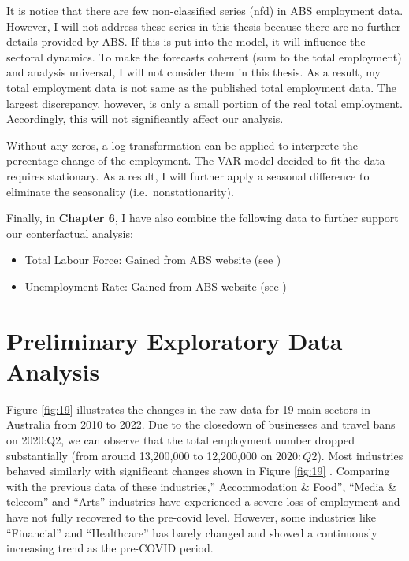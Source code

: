 \documentclass{monashthesis}
\begin{document}
It is notice that there are few non-classified series (nfd) in ABS employment data. However, I will not address these series in this thesis because there are no further details provided by ABS. If this is put into the model, it will influence the sectoral dynamics. To make the forecasts coherent (sum to the total employment) and analysis universal, I will not consider them in this thesis. As a result, my total employment data is not same as the published total employment data. The largest discrepancy, however, is only a small portion of the real total employment. Accordingly, this will not significantly affect our analysis.

Without any zeros, a log transformation can be applied to interprete the percentage change of the employment. The VAR model decided to fit the data requires stationary. As a result, I will further apply a seasonal difference to eliminate the seasonality (i.e.~nonstationarity).

Finally, in \textbf{Chapter 6}, I have also combine the following data to further support our conterfactual analysis:

\begin{itemize}
\item
  Total Labour Force: Gained from ABS website (see \textcite{ABS2022})
\item
  Unemployment Rate: Gained from ABS website (see \textcite{ABS2022a})
\end{itemize}

\hypertarget{preliminary-exploratory-data-analysis}{%
\section{Preliminary Exploratory Data Analysis}\label{preliminary-exploratory-data-analysis}}

Figure \ref{fig:19} illustrates the changes in the raw data for 19 main sectors in Australia from 2010 to 2022. Due to the closedown of businesses and travel bans on 2020:Q2, we can observe that the total employment number dropped substantially (from around 13,200,000 to 12,200,000 on \(2020:Q2\)). Most industries behaved similarly with significant changes shown in Figure \ref{fig:19} . Comparing with the previous data of these industries,'' Accommodation \& Food'', ``Media \& telecom'' and ``Arts'' industries have experienced a severe loss of employment and have not fully recovered to the pre-covid level. However, some industries like ``Financial'' and ``Healthcare'' has barely changed and showed a continuously increasing trend as the pre-COVID period.
\end{document}
